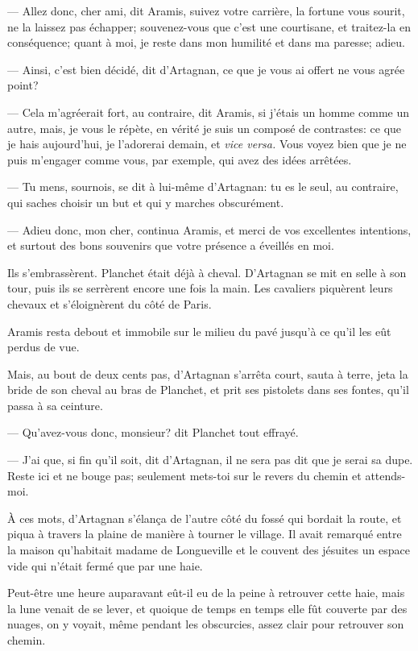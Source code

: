 — Allez donc, cher ami, dit Aramis, suivez votre carrière, la fortune vous sourit, ne la laissez pas échapper; souvenez-vous que c'est une courtisane, et traitez-la en conséquence; quant à moi, je reste dans mon humilité et dans ma paresse; adieu.

— Ainsi, c'est bien décidé, dit d'Artagnan, ce que je vous ai offert ne vous agrée point?

— Cela m'agréerait fort, au contraire, dit Aramis, si j'étais un homme comme un autre, mais, je vous le répète, en vérité je suis un composé de contrastes: ce que je hais aujourd'hui, je l'adorerai demain, et \textit{vice versa.} Vous voyez bien que je ne puis m'engager comme vous, par exemple, qui avez des idées arrêtées.

— Tu mens, sournois, se dit à lui-même d'Artagnan: tu es le seul, au contraire, qui saches choisir un but et qui y marches obscurément.

— Adieu donc, mon cher, continua Aramis, et merci de vos excellentes intentions, et surtout des bons souvenirs que votre présence a éveillés en moi.

Ils s'embrassèrent. Planchet était déjà à cheval. D'Artagnan se mit en selle à son tour, puis ils se serrèrent encore une fois la main. Les cavaliers piquèrent leurs chevaux et s'éloignèrent du côté de Paris.

Aramis resta debout et immobile sur le milieu du pavé jusqu'à ce qu'il les eût perdus de vue.

Mais, au bout de deux cents pas, d'Artagnan s'arrêta court, sauta à terre, jeta la bride de son cheval au bras de Planchet, et prit ses pistolets dans ses fontes, qu'il passa à sa ceinture.

— Qu'avez-vous donc, monsieur? dit Planchet tout effrayé.

— J'ai que, si fin qu'il soit, dit d'Artagnan, il ne sera pas dit que je serai sa dupe. Reste ici et ne bouge pas; seulement mets-toi sur le revers du chemin et attends-moi.

À ces mots, d'Artagnan s'élança de l'autre côté du fossé qui bordait la route, et piqua à travers la plaine de manière à tourner le village. Il avait remarqué entre la maison qu'habitait madame de Longueville et le couvent des jésuites un espace vide qui n'était fermé que par une haie.

Peut-être une heure auparavant eût-il eu de la peine à retrouver cette haie, mais la lune venait de se lever, et quoique de temps en temps elle fût couverte par des nuages, on y voyait, même pendant les obscurcies, assez clair pour retrouver son chemin.

